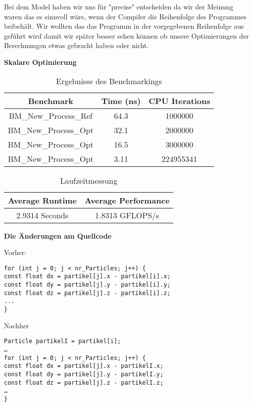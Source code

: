 \documentclass{article}
\begin{document}
Bei dem Model haben wir uns für "precise" entscheiden da wir der Meinung waren das es
sinnvoll wäre, wenn der Compiler die Reihenfolge des Programmes beibehält. Wir wollten das
das Programm in der vorgegebenen Reihenfolge aus geführt wird damit wir später besser
sehen können ob unsere Optimierungen der Berechnungen etwas gebracht haben oder nicht.

\textbf{Skalare Optimierung}

\begin{table}[h]
\centering
\caption{Ergebnisse des Benchmarkings}
\label{tab:benchmarking}   
\begin{tabular}{|c|c|c|}
\hline
\textbf{Benchmark} & \textbf{Time (ns)} & \textbf{CPU Iterations} \\
\hline
BM\_New\_Process\_Ref & 64.3 & 1000000 \\ 
\hline
BM\_New\_Process\_Opt & 32.1 & 2000000 \\ 
\hline
BM\_New\_Process\_Opt & 16.5 & 3000000 \\ 
\hline
BM\_New\_Process\_Opt & 3.11 & 224955341 \\ 
\hline
\end{tabular}
\end{table}

\begin{table}[h]
\centering
\caption{Laufzeitmessung}
\label{tab:laufzeitmessung}   
\begin{tabular}{|c|c|}
\hline
\textbf{Average Runtime} & \textbf{Average Performance} \\
\hline
2.9314 Seconds & 1.8313 GFLOPS/s \\ 
\hline
\end{tabular}
\end{table}

\newpage



\textbf{Die Änderungen am Quellcode}

Vorher: 
\begin{verbatim}
for (int j = 0; j < nr_Particles; j++) {
const float dx = partikel[j].x - partikel[i].x;
const float dy = partikel[j].y - partikel[i].y;
const float dz = partikel[j].z - partikel[i].z;
...
}
\end{verbatim}

Nachher
\begin{verbatim}
Particle partikelI = partikel[i];
…
for (int j = 0; j < nr_Particles; j++) {
const float dx = partikel[j].x - partikelI.x;
const float dy = partikel[j].y - partikelI.y;
const float dz = partikel[j].z - partikelI.z;
…
}
\end{verbatim}
\end{document}
